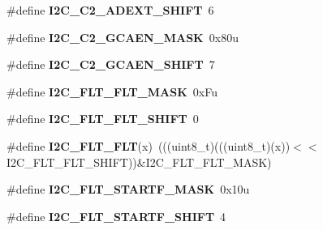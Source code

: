 \begin{DoxyCompactItemize}
\item 
\#define {\bfseries I2\+C\+\_\+\+C2\+\_\+\+A\+D\+E\+X\+T\+\_\+\+S\+H\+I\+FT}~6\hypertarget{group__I2C__Register__Masks_ga266bbd66a022e8b78eb5501d9d927164}{}\label{group__I2C__Register__Masks_ga266bbd66a022e8b78eb5501d9d927164}

\item 
\#define {\bfseries I2\+C\+\_\+\+C2\+\_\+\+G\+C\+A\+E\+N\+\_\+\+M\+A\+SK}~0x80u\hypertarget{group__I2C__Register__Masks_gabe69d0985ed23c71c071a6ebd93f65df}{}\label{group__I2C__Register__Masks_gabe69d0985ed23c71c071a6ebd93f65df}

\item 
\#define {\bfseries I2\+C\+\_\+\+C2\+\_\+\+G\+C\+A\+E\+N\+\_\+\+S\+H\+I\+FT}~7\hypertarget{group__I2C__Register__Masks_ga2621c8acf26335441da9ced92ca4d29f}{}\label{group__I2C__Register__Masks_ga2621c8acf26335441da9ced92ca4d29f}

\item 
\#define {\bfseries I2\+C\+\_\+\+F\+L\+T\+\_\+\+F\+L\+T\+\_\+\+M\+A\+SK}~0x\+Fu\hypertarget{group__I2C__Register__Masks_ga61b9691f2f522b624d0ace6268c972df}{}\label{group__I2C__Register__Masks_ga61b9691f2f522b624d0ace6268c972df}

\item 
\#define {\bfseries I2\+C\+\_\+\+F\+L\+T\+\_\+\+F\+L\+T\+\_\+\+S\+H\+I\+FT}~0\hypertarget{group__I2C__Register__Masks_ga87c3021777b04e02f3c0481cdbde30e5}{}\label{group__I2C__Register__Masks_ga87c3021777b04e02f3c0481cdbde30e5}

\item 
\#define {\bfseries I2\+C\+\_\+\+F\+L\+T\+\_\+\+F\+LT}(x)~(((uint8\+\_\+t)(((uint8\+\_\+t)(x))$<$$<$I2\+C\+\_\+\+F\+L\+T\+\_\+\+F\+L\+T\+\_\+\+S\+H\+I\+FT))\&I2\+C\+\_\+\+F\+L\+T\+\_\+\+F\+L\+T\+\_\+\+M\+A\+SK)\hypertarget{group__I2C__Register__Masks_ga7a184e93601a1086484b0ac2752cab00}{}\label{group__I2C__Register__Masks_ga7a184e93601a1086484b0ac2752cab00}

\item 
\#define {\bfseries I2\+C\+\_\+\+F\+L\+T\+\_\+\+S\+T\+A\+R\+T\+F\+\_\+\+M\+A\+SK}~0x10u\hypertarget{group__I2C__Register__Masks_ga5957e41d1f413c45abde107e68d1f054}{}\label{group__I2C__Register__Masks_ga5957e41d1f413c45abde107e68d1f054}

\item 
\#define {\bfseries I2\+C\+\_\+\+F\+L\+T\+\_\+\+S\+T\+A\+R\+T\+F\+\_\+\+S\+H\+I\+FT}~4\hypertarget{group__I2C__Register__Masks_ga60596c41d1748a538e7e752c9b701bb3}{}\label{group__I2C__Register__Masks_ga60596c41d1748a538e7e752c9b701bb3}


\end{DoxyCompactItemize}
